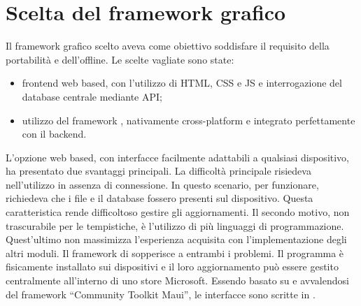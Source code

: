 \section{Scelta del framework grafico}
Il framework grafico scelto aveva come obiettivo soddisfare il requisito della portabilità e dell'offline.
Le scelte vagliate sono state:
\begin{itemize}
    \item frontend web based, con l'utilizzo di \ac{HTML}, \ac{CSS} e \ac{JS} e interrogazione
          del database centrale mediante \ac{API};
    \item utilizzo del framework \maui{}, nativamente cross-platform e integrato perfettamente con il backend.
\end{itemize}
L'opzione web based, con interfacce facilmente adattabili a qualsiasi dispositivo,
ha presentato due svantaggi principali.
La difficoltà principale risiedeva nell'utilizzo in assenza di connessione.
In questo scenario, per funzionare, richiedeva che i file e il database fossero presenti sul dispositivo.
Questa caratteristica rende difficoltoso gestire gli aggiornamenti.
Il secondo motivo, non trascurabile per le tempistiche,
è l'utilizzo di più linguaggi di programmazione.
Quest'ultimo non massimizza l'esperienza acquisita con l'implementazione degli altri moduli.
Il framework \maui{} di \dotnet{} sopperisce a entrambi i problemi.
Il programma è fisicamente installato sui dispositivi e il loro aggiornamento
può essere gestito centralmente all'interno di uno store Microsoft.
Essendo basato su \dotnet{} e avvalendosi del framework ``Community Toolkit Maui'',
le interfacce sono scritte in \csharp.

